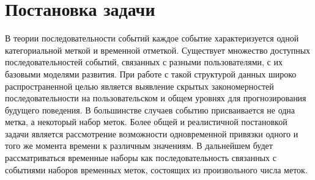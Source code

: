 \documentclass[a4paper, 12pt]{article} %
\begin{document}
\section{Постановка задачи}



В теории последовательности событий каждое событие характеризуется одной категориальной меткой и временной отметкой. Существует множество доступных последовательностей событий, связанных с разными пользователями, с их базовыми моделями развития. При работе с такой структурой данных широко распространенной целью является выявление скрытых закономерностей последовательности на пользовательском и общем уровнях для прогнозирования будущего поведения. В большинстве случаев событию присваивается не одна метка, а некоторый набор меток. Более общей и реалистичной постановкой задачи является рассмотрение возможности одновременной привязки одного и того же момента времени к различным значениям. В дальнейшем будет рассматриваться временные наборы как последовательность связанных с событиями наборов временных меток, состоящих из произвольного числа меток.
\end{document}
